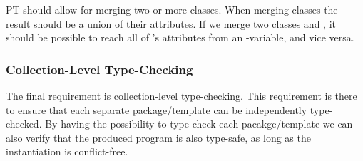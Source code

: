 PT should allow for merging two or more classes.
When merging classes the result should be a union of their attributes.
If we merge two classes  and , it should be possible to reach all of 's attributes from an -variable, and vice versa.

%

\subsubsection{Collection-Level Type-Checking}\label{subsubsec:collection-level-type-checking}

The final requirement is collection-level type-checking.
This requirement is there to ensure that each separate package/template can be independently type-checked.
By having the possibility to type-check each pacakge/template we can also verify that the produced program is also type-safe, as long as the instantiation is conflict-free.

